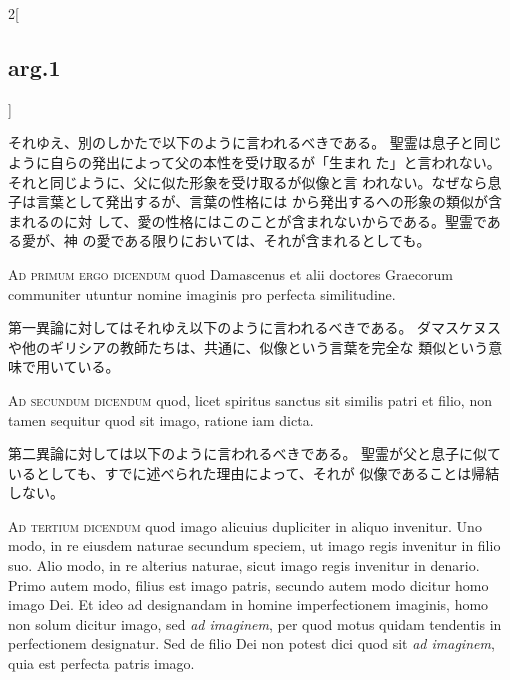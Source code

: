 \documentclass[paper=a4paper,fontsize=10pt,jafontsize=9pt,titlepage]{jlreq}
\begin{document}
\begin{paracol}{2}[\subsection{arg.1}]
\switchcolumn

それゆえ、別のしかたで以下のように言われるべきである。
聖霊は息子と同じように自らの発出によって父の本性を受け取るが「生まれ
 た」と言われない。それと同じように、父に似た形象を受け取るが似像と言
 われない。なぜなら息子は言葉として発出するが、言葉の性格には
 から発出するへの形象の類似が含まれるのに対
 して、愛の性格にはこのことが含まれないからである。聖霊である愛が、神
 の愛である限りにおいては、それが含まれるとしても。

\switchcolumn*[\subsection{ad.1}]

{\scshape Ad primum ergo dicendum} quod Damascenus et alii doctores Graecorum
communiter utuntur nomine imaginis pro perfecta similitudine.

\switchcolumn

第一異論に対してはそれゆえ以下のように言われるべきである。
ダマスケヌスや他のギリシアの教師たちは、共通に、似像という言葉を完全な
 類似という意味で用いている。

\switchcolumn*[\subsection{ad.2}]

{\scshape Ad secundum dicendum} quod, licet spiritus sanctus sit similis patri et
filio, non tamen sequitur quod sit imago, ratione iam dicta.

\switchcolumn

第二異論に対しては以下のように言われるべきである。
聖霊が父と息子に似ているとしても、すでに述べられた理由によって、それが
 似像であることは帰結しない。

\switchcolumn*[\subsection{ad.3}]

{\scshape Ad tertium dicendum} quod imago alicuius dupliciter in aliquo
invenitur. Uno modo, in re eiusdem naturae secundum speciem, ut imago
regis invenitur in filio suo. Alio modo, in re alterius naturae, sicut
imago regis invenitur in denario. Primo autem modo, filius est imago
patris, secundo autem modo dicitur homo imago Dei. Et ideo ad
designandam in homine imperfectionem imaginis, homo non solum dicitur
imago, sed {\itshape ad imaginem}, per quod motus quidam tendentis in
perfectionem designatur. Sed de filio Dei non potest dici quod sit {\itshape ad
imaginem}, quia est perfecta patris imago.


\end{paracol}
\end{document}
